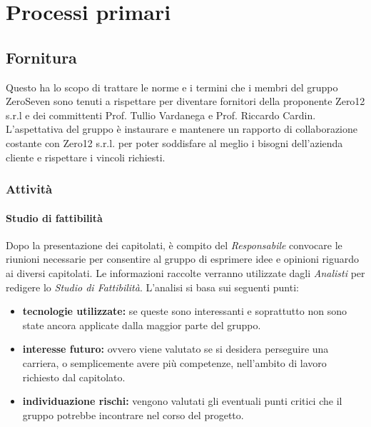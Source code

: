 \section{Processi primari}
\subsection{Fornitura}			
Questo  ha lo scopo di trattare le norme e i termini che i membri del gruppo ZeroSeven sono tenuti a rispettare per diventare fornitori della proponente Zero12 s.r.l e dei committenti Prof. Tullio Vardanega e Prof. Riccardo Cardin. \\
L'aspettativa del gruppo è instaurare e mantenere un rapporto di collaborazione costante con Zero12 s.r.l. per poter soddisfare al meglio i bisogni dell'azienda cliente e rispettare i vincoli richiesti.

\subsubsection{Attività}
\paragraph{Studio di fattibilità} 
Dopo la presentazione dei capitolati, è compito del \textit{Responsabile} convocare le riunioni necessarie per consentire al gruppo di esprimere idee e opinioni riguardo ai diversi capitolati. Le informazioni raccolte verranno utilizzate dagli \textit{Analisti} per redigere lo \textit{Studio di Fattibilità}. L'analisi si basa sui seguenti punti:
\begin{itemize}
	\item \textbf{tecnologie utilizzate:} se queste sono interessanti e soprattutto non sono state ancora applicate dalla maggior parte del gruppo.
	\item \textbf{interesse futuro:} ovvero viene valutato se si desidera perseguire una carriera, o semplicemente avere più competenze, nell'ambito di lavoro richiesto dal capitolato.
	\item \textbf{individuazione rischi:} vengono valutati gli eventuali punti critici che il gruppo potrebbe incontrare nel corso del progetto.
\end{itemize}


